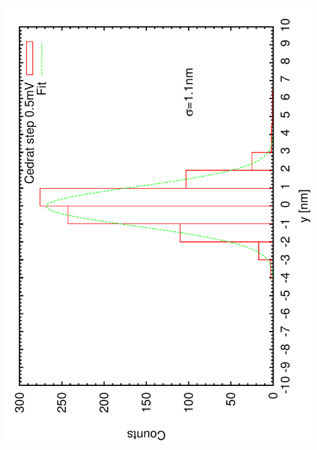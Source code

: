 \documentclass[a4paper,11pt]{book}
\begin{document}
\includegraphics[angle=-90,scale=0.15]{imagestep12.pdf}
\end{document}
